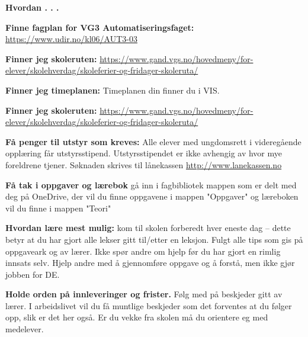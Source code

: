 

\centerline{\bf Hvordan . . .} \bigskip 

\noindent
{\bf Finne fagplan for VG3 Automatiseringsfaget:} \url{https://www.udir.no/kl06/AUT3-03}
\vskip 10pt

\noindent
{\bf Finner jeg skoleruten:} \url{https://www.gand.vgs.no/hovedmeny/for-elever/skolehverdag/skoleferier-og-fridager-skoleruta/}
\vskip 10pt

\noindent
{\bf Finner jeg timeplanen:} Timeplanen din finner du i VIS. 
\vskip 10pt

\noindent
{\bf Finner jeg skoleruten:} \url{https://www.gand.vgs.no/hovedmeny/for-elever/skolehverdag/skoleferier-og-fridager-skoleruta/}
\vskip 10pt

\noindent
{\bf Få penger til utstyr som kreves:} Alle elever med ungdomsrett i videregående opplæring får utstyrsstipend. Utstyrsstipendet er ikke avhengig av hvor mye foreldrene tjener.
Søknaden skrives til lånekassen \url{http://www.lanekassen.no}
\vskip 10pt

\noindent
{\bf Få tak i oppgaver og lærebok} gå inn i fagbibliotek mappen som er delt med deg på OneDrive, der vil du finne oppgavene i mappen "Oppgaver" og læreboken vil du finne i mappen "Teori" 
\vskip 10pt


\noindent
{\bf Hvordan lære mest mulig:} kom til skolen forberedt hver eneste dag -- dette betyr at du har gjort alle lekser gitt til/etter en leksjon. Fulgt alle tips som gis på oppgaveark og av lærer. Ikke spør andre om hjelp før du har gjort en rimlig innsats selv. Hjelp andre med å gjennomføre oppgave og å forstå, men ikke gjør jobben for DE. 


\vskip 10pt

\noindent
{\bf Holde orden på innleveringer og frister.} Følg med på beskjeder gitt av lærer. I arbeidslivet vil du få muntlige beskjeder som det forventes at du følger opp, slik er det her også. Er du vekke fra skolen må du orientere eg med medelever. 


